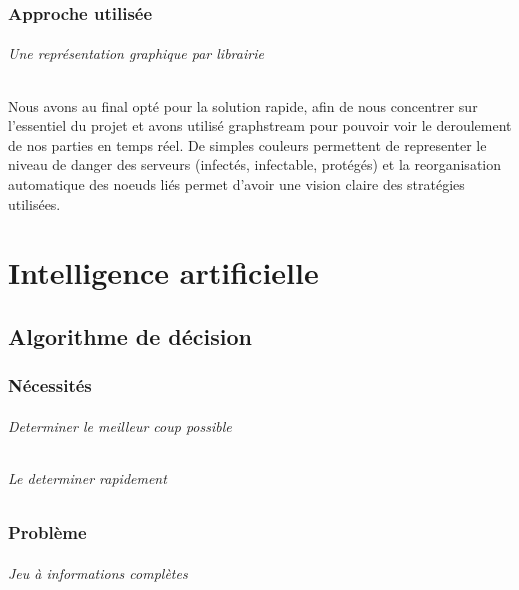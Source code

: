 \documentclass{scrreprt}
\begin{document}
    \section{Approche utilisée}

    \paragraph{Une représentation graphique par librairie}
    Nous avons au final opté pour la solution rapide, afin de nous concentrer
    sur l'essentiel du projet et avons utilisé graphstream pour pouvoir voir
    le deroulement de nos parties en temps réel.
    De simples couleurs permettent de representer le niveau de danger des
    serveurs (infectés, infectable, protégés) et la reorganisation
    automatique des noeuds liés permet d'avoir une vision claire des
    stratégies utilisées.

    \part{Intelligence artificielle}

    \chapter{Algorithme de décision}

    \section{Nécessités}

    \paragraph{Determiner le meilleur coup possible}

    \paragraph{Le determiner rapidement}

    \section{Problème}

    \paragraph{Jeu à informations complètes}
\end{document}
